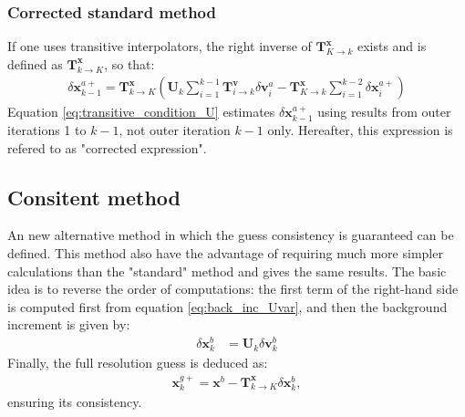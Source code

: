 \documentclass[npg, manuscript]{copernicus}
\begin{document}
\subsubsection{Corrected standard method}
If one uses transitive interpolators, the right inverse of $\mathbf{T}^\mathbf{x}_{K \rightarrow k}$ exists and is defined as $\mathbf{T}^\mathbf{x}_{k \rightarrow K}$, so that:
\begin{align}
\label{eq:transitive_condition_U}
\boxed{\delta \mathbf{x}^{a+}_{k-1} = \mathbf{T}^\mathbf{x}_{k \rightarrow K} \left(\mathbf{U}_k \sum_{i=1}^{k-1} \mathbf{T}^\mathbf{v}_{i \rightarrow k} \delta \mathbf{v}^a_i - \mathbf{T}^\mathbf{x}_{K \rightarrow k} \sum_{i=1}^{k-2} \delta \mathbf{x}^{a+}_i\right)}
\end{align}
Equation \eqref{eq:transitive_condition_U} estimates $\delta \mathbf{x}^{a+}_{k-1}$ using results from outer iterations 1 to $k-1$, not outer iteration $k-1$ only.  Hereafter, this expression is refered to as "corrected expression".

\subsection{Consitent method}
An new alternative method in which the guess consistency is guaranteed can be defined. This method also have the advantage of requiring much more simpler calculations than the "standard" method and gives the same results. The basic idea is to reverse the order of computations: the first term of the right-hand side is computed first from equation \eqref{eq:back_inc_Uvar}, and then the background increment is given by:
\begin{align}
\label{eq:alternative_U}
\delta \mathbf{x}^b_k & = \mathbf{U}_k \delta \mathbf{v}^b_k
\end{align}
Finally, the full resolution guess is deduced as:
\begin{align}
\label{eq:alternative_guess_full}
\mathbf{x}^{g+}_k = \mathbf{x}^b - \mathbf{T}^\mathbf{x}_{k \rightarrow K} \delta \mathbf{x}^b_k,
\end{align}
ensuring its consistency.
\end{document}
